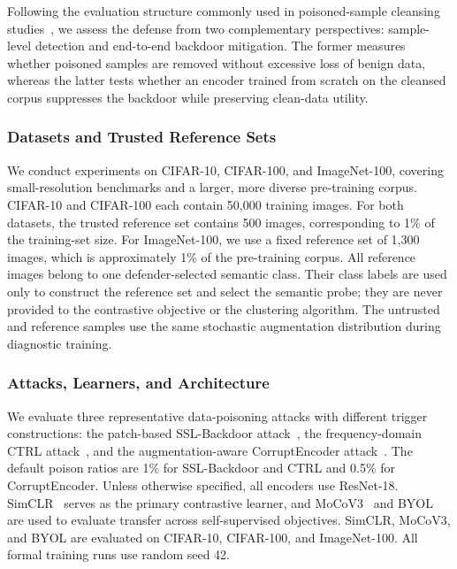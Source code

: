 \documentclass[10pt,journal]{IEEEtran}
\begin{document}
Following the evaluation structure commonly used in poisoned-sample
cleansing studies~\cite{Chen2025AUTO}, we assess the defense from two
complementary perspectives: sample-level detection and end-to-end
backdoor mitigation. The former measures whether poisoned samples are
removed without excessive loss of benign data, whereas the latter tests
whether an encoder trained from scratch on the cleansed corpus suppresses
the backdoor while preserving clean-data utility.

\subsubsection{Datasets and Trusted Reference Sets}
We conduct experiments on CIFAR-10, CIFAR-100, and ImageNet-100, covering
small-resolution benchmarks and a larger, more diverse pre-training
corpus. CIFAR-10 and CIFAR-100 each contain 50,000 training images. For
both datasets, the trusted reference set contains 500 images, corresponding
to 1\% of the training-set size. For ImageNet-100, we use a fixed reference
set of 1,300 images, which is approximately 1\% of the pre-training corpus.
All reference images belong to one defender-selected semantic class. Their
class labels are used only to construct the reference set and select the
semantic probe; they are never provided to the contrastive objective or the
clustering algorithm. The untrusted and reference samples use the same
stochastic augmentation distribution during diagnostic training.

\subsubsection{Attacks, Learners, and Architecture}
We evaluate three representative data-poisoning attacks with different
trigger constructions: the patch-based SSL-Backdoor attack~\cite{Saha2022SSLBackdoor},
the frequency-domain CTRL attack~\cite{Li2023CTRL}, and the
augmentation-aware CorruptEncoder attack~\cite{Zhang2024CorruptEncoder}.
The default poison ratios are 1\% for SSL-Backdoor and CTRL and 0.5\% for
CorruptEncoder. Unless otherwise specified, all encoders use ResNet-18.
SimCLR~\cite{Chen2020SimCLR} serves as the primary contrastive learner,
and MoCoV3~\cite{Chen2021MoCoV3} and BYOL~\cite{Grill2020BYOL} are used
to evaluate transfer across self-supervised objectives. SimCLR, MoCoV3,
and BYOL are evaluated on CIFAR-10, CIFAR-100, and ImageNet-100. All
formal training runs use random seed 42.
\end{document}
